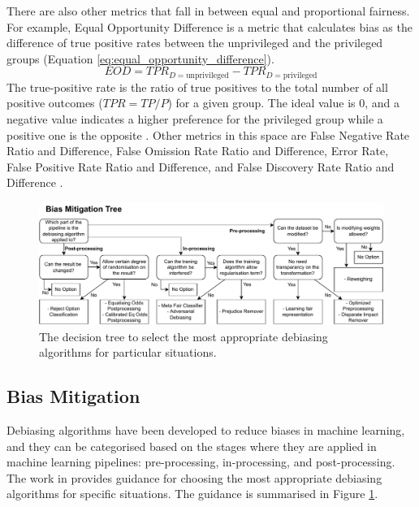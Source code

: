 \documentclass[sigconf,review]{acmart}
\begin{document}
	There are also other metrics that fall in between equal and proportional fairness. For example, Equal Opportunity Difference \cite{ibmaif3602022doc,bellamy2018ai} is a metric that calculates bias as the difference of true positive rates between the unprivileged and the privileged groups (Equation \ref{eq:equal_opportunity_difference}). 
	\begin{equation} \label{eq:equal_opportunity_difference}
		EOD = TPR_{D = \text{unprivileged}} - TPR_{D = \text{privileged}}	
	\end{equation}
	The true-positive rate is the ratio of true positives to the total number of all positive outcomes ($TPR=TP/P$) for a given group. The ideal value is 0, and a negative value indicates a higher preference for the privileged group while a positive one is the opposite \cite{ibmaif3602022doc,bellamy2018ai}. Other metrics in this space are False Negative Rate Ratio and Difference, False Omission Rate Ratio and Difference, Error Rate, False Positive Rate Ratio and Difference, and False Discovery Rate Ratio and Difference \cite{mahoney2020ai,ibmaif3602022guidance}.
	
	
	\begin{figure}
		\includegraphics[width=\linewidth]{figures/wizard-debiasing}
		\caption{The decision tree to select the most appropriate debiasing algorithms for particular situations.}
		\label{fig:wizard-debiasing}
	\end{figure}
	
	\subsection{Bias Mitigation}
	\label{sec:bias_mitigation}
	
	Debiasing algorithms have been developed to reduce biases in machine learning, and they can be categorised based on the stages where they are applied in machine learning pipelines: pre-processing, in-processing, and post-processing. The work in  \cite{mahoney2020ai,ibmaif3602022guidance} provides guidance for choosing the most appropriate debiasing algorithms for specific situations. The guidance is summarised in Figure \ref{fig:wizard-debiasing}.
	
\end{document}
